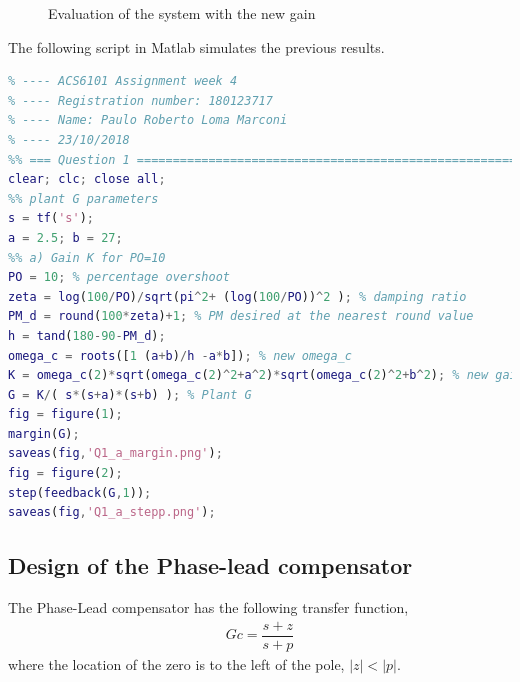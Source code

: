 \documentclass[11pt, a4paper]{article}
\begin{document}
\begin{figure}[H]
	\centering
	\caption{Evaluation of the system with the new gain }
	\label{fig:Q1_a}
\end{figure}

The following script in Matlab simulates the previous results.

\begin{lstlisting}[language=matlab, caption={}, label={}]
%% ========================================================================
% ---- ACS6101 Assignment week 4
% ---- Registration number: 180123717
% ---- Name: Paulo Roberto Loma Marconi
% ---- 23/10/2018
%% === Question 1 =========================================================
clear; clc; close all;
%% plant G parameters
s = tf('s');
a = 2.5; b = 27;
%% a) Gain K for PO=10
PO = 10; % percentage overshoot
zeta = log(100/PO)/sqrt(pi^2+ (log(100/PO))^2 ); % damping ratio
PM_d = round(100*zeta)+1; % PM desired at the nearest round value
h = tand(180-90-PM_d); 
omega_c = roots([1 (a+b)/h -a*b]); % new omega_c
K = omega_c(2)*sqrt(omega_c(2)^2+a^2)*sqrt(omega_c(2)^2+b^2); % new gain K
G = K/( s*(s+a)*(s+b) ); % Plant G
fig = figure(1);
margin(G);
saveas(fig,'Q1_a_margin.png');
fig = figure(2);
step(feedback(G,1));
saveas(fig,'Q1_a_stepp.png');
\end{lstlisting}


\subsection{Design of the Phase-lead compensator}
The Phase-Lead compensator has the following transfer function,
\begin{align}
Gc = \dfrac{s+z}{s+p} \label{eq:Gc_lead}
\end{align}
where the location of the zero is to the left of the pole, $|z|<|p|$.
\end{document}

